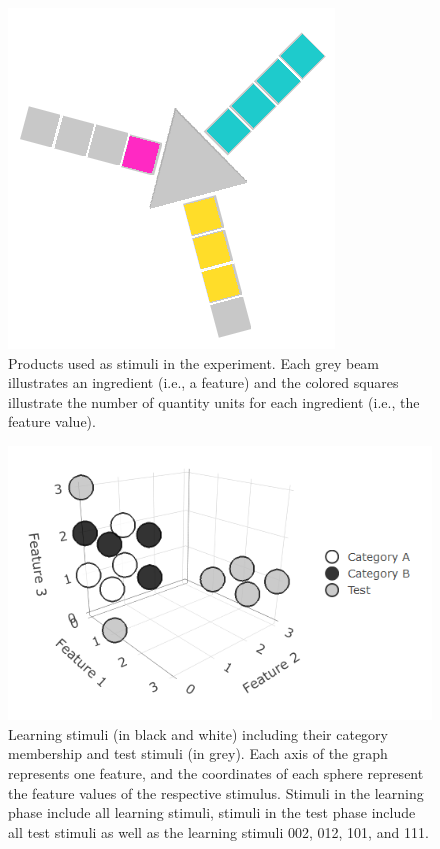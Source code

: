 \documentclass[a4paper,man,natbib]{apa6}
\begin{document}
\begin{figure}[htbp]
\centering
\includegraphics[width = \textwidth]{fig_material.PNG}
\caption{Products used as stimuli in the experiment. Each grey beam illustrates an ingredient (i.e., a feature) and the colored squares illustrate the number of quantity units for each ingredient (i.e., the feature value).}
\label{fig:material}
\end{figure}

\begin{figure}[htbp]
\centering
\includegraphics[width = \textwidth]{fig_environment.png}
\caption{Learning stimuli (in black and white) including their category membership and test stimuli (in grey). Each axis of the graph represents one feature, and the coordinates of each sphere represent the feature values of the respective stimulus. Stimuli in the learning phase include all learning stimuli, stimuli in the test phase include all test stimuli as well as the learning stimuli 002, 012, 101, and 111.}
\label{fig:environment}
\end{figure}
\end{document}
